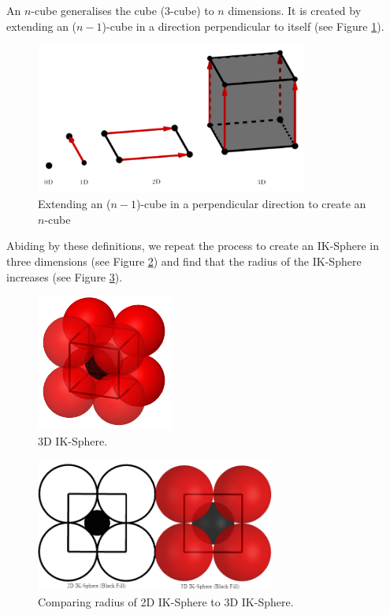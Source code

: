 \begin{definition}[$n$-Cube]\label{def:n-cube}
    An $n$-cube generalises the cube (3-cube) to $n$ dimensions. It is created by extending an ($n-1$)-cube in a direction perpendicular to itself (see Figure \ref{fig:how to n cube}).
    \begin{figure}[H]
    \centering
    \includegraphics[width=0.8\textwidth]{images/how to make n sphere.png}
    \caption{\label{fig:how to n cube}Extending an ($n-1$)-cube in a perpendicular direction to create an $n$-cube}
    \end{figure}
\end{definition}
\noindent Abiding by these definitions, we repeat the process to create an IK-Sphere in three dimensions (see Figure \ref{fig:3d_IK_Sphere}) and find that the radius of the IK-Sphere increases (see Figure \ref{fig:compare IK spheres}). 

\begin{figure}[H]
    \centering
    \includegraphics[width=0.4\textwidth]{images/3D IK.png}
    \caption{\label{fig:3d_IK_Sphere}3D IK-Sphere.}
\end{figure}

\begin{figure}[H]
    \centering
    \includegraphics[width=0.7\textwidth]{images/compare ik spheres.png}
    \caption{\label{fig:compare IK spheres}Comparing radius of 2D IK-Sphere to 3D IK-Sphere.}
\end{figure}

